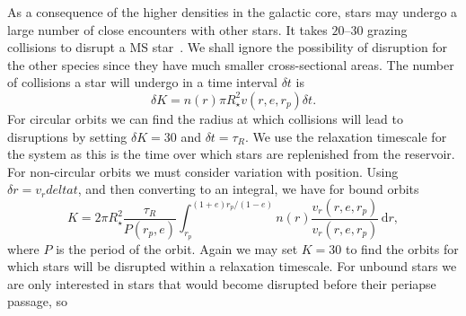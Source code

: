 \documentclass[useAMS,usenatbib]{mn2e}
\newcommand{\dd}{\ensuremath{\mathrm{d}}}
\newcommand{\intd}[4]{\ensuremath{\int_{#1}^{#2}{#3}\,\dd{#4}}}
\begin{document}
As a consequence of the higher densities in the galactic core, stars may undergo a large number of close encounters with other stars. It takes $20$--$30$ grazing collisions to disrupt a MS star~\cite{Frietag2006}. We shall ignore the possibility of disruption for the other species since they have much smaller cross-sectional areas. The number of collisions a star will undergo in a time interval $\delta t$ is
\begin{equation}
\delta K = n(r) \pi R_\star^2 v(r,e,r_p)\delta t.
\end{equation}
For circular orbits we can find the radius at which collisions will lead to disruptions by setting $\delta K = 30$ and $\delta t = \tau_R$. We use the relaxation timescale for the system as this is the time over which stars are replenished from the reservoir. For non-circular orbits we must consider variation with position. Using $\delta r = v_r delta t$, and then converting to an integral, we have for bound orbits
\begin{equation}
K = 2\pi R_\star^2 \frac{\tau_R}{P(r_p,e)}\intd{r_p}{(1+e)r_p/(1-e)}{n(r)\frac{v_r(r,e,r_p)}{v_r(r,e,r_p)}}{r},
\end{equation}
where $P$ is the period of the orbit. Again we may set $K = 30$ to find the orbits for which stars will be disrupted within a relaxation timescale. For unbound stars we are only interested in stars that would become disrupted before their periapse passage, so
\end{document}
